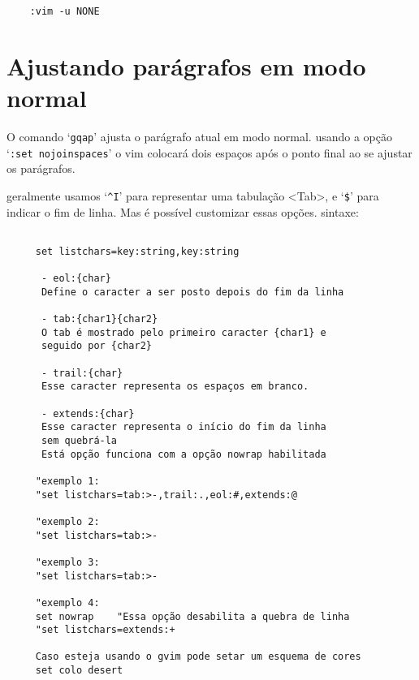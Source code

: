 \begin{verbatim}
    :vim -u NONE
\end{verbatim}


\section{Ajustando parágrafos em modo normal} %
\label{sec:Ajustando parágrafos em modo normal}

O comando `\verb|gqap|' ajusta o parágrafo atual em modo normal. 
{\Large {}} usando a opção `{\tt :set nojoinspaces}' o vim 
colocará dois espaços após o ponto final ao se ajustar os parágrafos.


geralmente usamos `\verb+^I+' para representar uma
tabulação <Tab>, e `\verb+$+' para indicar o
fim de linha. Mas é possível     customizar essas opções. sintaxe:                          

\begin{verbatim}
    
     set listchars=key:string,key:string                        

      - eol:{char} 
      Define o caracter a ser posto depois do fim da linha  

      - tab:{char1}{char2} 
      O tab é mostrado pelo primeiro caracter {char1} e     
      seguido por {char2}                                   

      - trail:{char}                                            
      Esse caracter representa os espaços em branco.        
                                                                
      - extends:{char}                                          
      Esse caracter representa o início do fim da linha      
      sem quebrá-la                                          
      Está opção funciona com a opção nowrap habilitada       
                                                                
     "exemplo 1:
     "set listchars=tab:>-,trail:.,eol:#,extends:@
     
     "exemplo 2:
     "set listchars=tab:>-
     
     "exemplo 3:
     "set listchars=tab:>-
     
     "exemplo 4:
     set nowrap    "Essa opção desabilita a quebra de linha
     "set listchars=extends:+
     
     Caso esteja usando o gvim pode setar um esquema de cores
     set colo desert
\end{verbatim}

